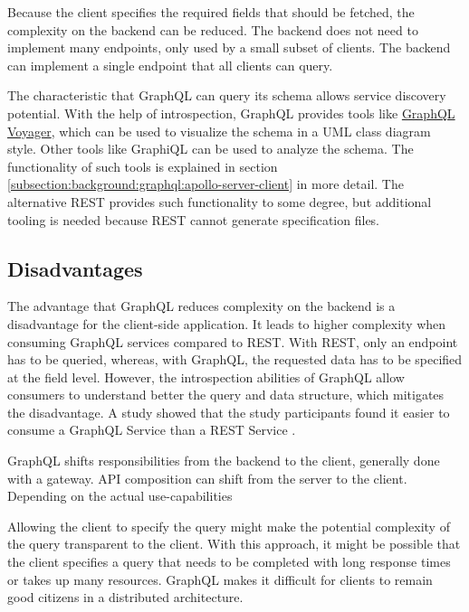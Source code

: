 \bigskip

\noindent Because the client specifies the required fields that should be fetched, the complexity on the backend can be reduced. The backend does not need to implement many endpoints, only used by a small subset of clients. The backend can implement a single endpoint that all clients can query. \cite{book:2018:richardson:background:bff:microservices-patterns}

\bigskip

\noindent The characteristic that GraphQL can query its schema allows service discovery potential. With the help of introspection, GraphQL provides tools like \href{https://ivangoncharov.github.io/graphql-voyager/}{GraphQL Voyager}, which can be used to visualize the schema in a \ac{UML} class diagram style. Other tools like GraphiQL can be used to analyze the schema. The functionality of such tools is explained in section \ref{subsection:background:graphql:apollo-server-client} in more detail. The alternative \ac{REST} provides such functionality to some degree, but additional tooling is needed because \ac{REST} cannot generate specification files.

\subsection{Disadvantages}\label{subsection:background:graphql:graphql-disadvantages}

\noindent The advantage that GraphQL reduces complexity on the backend is a disadvantage for the client-side application. It leads to higher complexity when consuming GraphQL services compared to \ac{REST}. With \ac{REST}, only an endpoint has to be queried, whereas, with GraphQL, the requested data has to be specified at the field level. However, the introspection abilities of GraphQL allow consumers to understand better the query and data structure, which mitigates the disadvantage. A study \cite{inproceedings:2020:brito:background:graphql:rest-vs-graphql} showed that the study participants found it easier to consume a GraphQL Service than a \ac{REST} Service \cite{inproceedings:2017:de-pauda:background:graphql:handling-anti-patterns}.

\bigskip

\noindent GraphQL shifts responsibilities from the backend to the client, generally done with a gateway. \ac{API} composition can shift from the server to the client. Depending on the actual use-capabilities

\bigskip

\noindent Allowing the client to specify the query might make the potential complexity of the query transparent to the client. With this approach, it might be possible that the client specifies a query that needs to be completed with long response times or takes up many resources. GraphQL makes it difficult for clients to remain good citizens in a distributed architecture. \cite{book:2018:richardson:background:bff:microservices-patterns}





